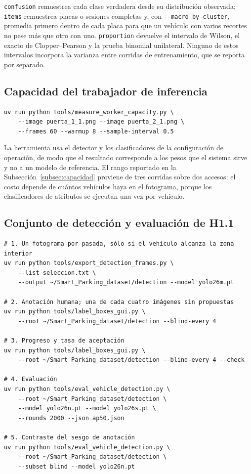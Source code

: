 \texttt{confusion} remuestrea cada clase verdadera desde su distribución observada;
\texttt{items} remuestrea placas o sesiones completas y, con
\texttt{-{}-macro-by-cluster}, promedia primero dentro de cada placa para que un
vehículo con varios recortes no pese más que otro con uno. \texttt{proportion}
devuelve el intervalo de Wilson, el exacto de Clopper--Pearson y la prueba binomial
unilateral. Ninguno de estos intervalos incorpora la varianza entre corridas de
entrenamiento, que se reporta por separado.

\subsection{Capacidad del trabajador de inferencia}

\begin{verbatim}
uv run python tools/measure_worker_capacity.py \
    --image puerta_1_1.png --image puerta_2_1.png \
    --frames 60 --warmup 8 --sample-interval 0.5
\end{verbatim}

La herramienta usa el detector y los clasificadores de la configuración de
operación, de modo que el resultado corresponde a los pesos que el sistema sirve y
no a un modelo de referencia. El rango reportado en la
Subsección~\ref{subsec:capacidad} proviene de tres corridas sobre dos accesos: el
costo depende de cuántos vehículos haya en el fotograma, porque los clasificadores
de atributos se ejecutan una vez por vehículo.

\subsection{Conjunto de detección y evaluación de H1.1}

\begin{verbatim}
# 1. Un fotograma por pasada, sólo si el vehículo alcanza la zona interior
uv run python tools/export_detection_frames.py \
    --list seleccion.txt \
    --output ~/Smart_Parking_dataset/detection --model yolo26m.pt

# 2. Anotación humana; una de cada cuatro imágenes sin propuestas
uv run python tools/label_boxes_gui.py \
    --root ~/Smart_Parking_dataset/detection --blind-every 4

# 3. Progreso y tasa de aceptación
uv run python tools/label_boxes_gui.py \
    --root ~/Smart_Parking_dataset/detection --blind-every 4 --check

# 4. Evaluación
uv run python tools/eval_vehicle_detection.py \
    --root ~/Smart_Parking_dataset/detection \
    --model yolo26n.pt --model yolo26s.pt \
    --rounds 2000 --json ap50.json

# 5. Contraste del sesgo de anotación
uv run python tools/eval_vehicle_detection.py \
    --root ~/Smart_Parking_dataset/detection \
    --subset blind --model yolo26n.pt
\end{verbatim}


